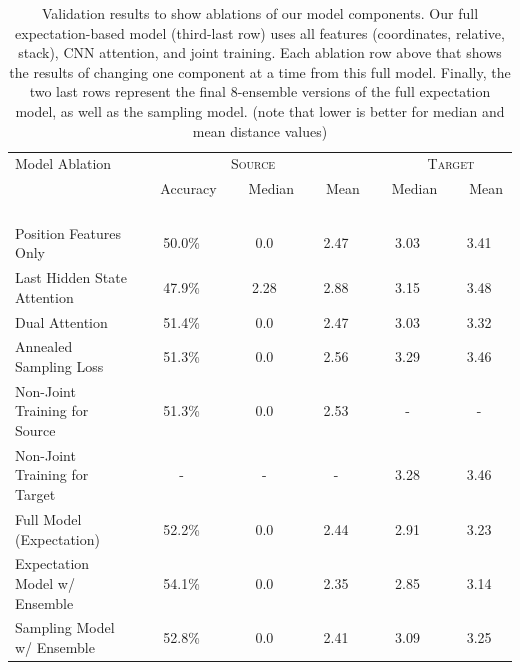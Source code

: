 \documentclass[letterpaper]{article} %
\begin{document}
\begin{table}[ht!]
\begin{center}
\begin{tabular}{|l|ccc|cc|}
\hline
\multirow{1}{*}{Model Ablation } & \multicolumn{3}{c|}{\textsc{Source}} & \multicolumn{2}{c|}{\textsc{ \ \ \ Target}} \\
  &  \ \ Accuracy \ \  & \ \  Median \ \  &  \ \ Mean  \ \  & \ \  Median \ \  &  \ \ Mean \ \  \\
\hline
Position Features Only				&	50.0\%			&	0.0		&	2.47	&	3.03	&	3.41	\\ 
\hline
Last Hidden State Attention	& 	47.9\%	&	2.28	&	2.88	&	3.15	&	3.48	\\
Dual Attention 	& 	51.4\%	&	0.0		&	2.47	&	3.03	&	3.32	\\
\hline
Annealed Sampling Loss			&	51.3\%		&	0.0	&	2.56	&	3.29	&	3.46	\\
\hline
Non-Joint Training for Source \ \ \ \ \ \ 	&	51.3\%		&	0.0			&	2.53	&	-	&	-	\\
Non-Joint Training for Target	&	-		&	-			& -	&	3.28	&	3.46	\\
\hline
Full Model (Expectation)	&	52.2\%	&	0.0		&	2.44	&	2.91	&	3.23	\\
\hline
\hline
Expectation Model w/ Ensemble	&	54.1\%	&	0.0		&	2.35	&	2.85	&	3.14	\\
Sampling Model w/ Ensemble	&	52.8\%	&	0.0		&	2.41	&	3.09	&	3.25	\\
\hline
\end{tabular}
\end{center}
\caption{Validation results to show ablations of our model components. Our full expectation-based model (third-last row) uses all features (coordinates, relative, stack), CNN attention, and joint training. Each ablation row above that shows the results of changing one component at a time from this full model. Finally, the two last rows represent the final 8-ensemble versions of the full expectation model, as well as the sampling model. (note that lower is better for median and mean distance values)}
\label{table:valid}
\end{table}
\end{document}

